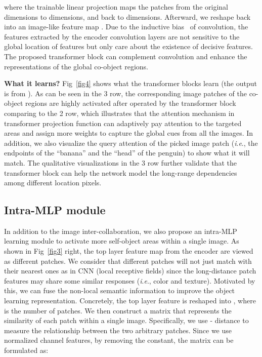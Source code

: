 \documentclass[journal]{IEEEtran}
\newcommand{\ie}{\textit{i}.\textit{e}., }
\begin{document}
where the trainable linear projection maps the patches from the original  dimensions to  dimensions, and back to  dimensions.
Afterward, we reshape  back into an image-like feature map .
Due to the inductive bias~\cite{goyal2020inductive} of convolution, the features extracted by the encoder convolution layers are not sensitive to the global location of features but only care about the existence of decisive features. The proposed transformer block can complement convolution and enhance the representations of the global co-object regions.

\vspace{1ex}

\noindent \textbf{What it learns?}
Fig~\ref{fig4} shows what the transformer blocks learn (the output is from ). As can be seen in the 3 row, the corresponding image patches of the co-object regions are highly activated after operated by the transformer block comparing to the 2 row, which illustrates that the attention mechanism in transformer projection function can adaptively pay attention to the targeted areas and assign more weights to capture the global cues from all the images.
In addition, we also visualize the query attention of the picked image  patch (\ie the endpoints of the “banana” and the “head” of the penguin) to show what it will match.  
The qualitative visualizations in the 3 row further validate that the transformer block can help the network model the long-range dependencies among different location pixels.


\subsection{Intra-MLP module}
In addition to the image inter-collaboration, we also propose an intra-MLP learning module to activate more self-object areas within a single image. 
As shown in Fig~\ref{fig3} right, the top layer feature map from the encoder are viewed as different patches. We consider that different patches will not just match with their nearest ones as in CNN (local receptive fields) since the long-distance patch features may share some similar responses (\ie color and texture).
Motivated by this, we can fuse the non-local semantic information to improve the object learning representation. Concretely, the top layer feature  is reshaped into , where  is the number of patches. We then construct a matrix  that represents the similarity of each patch within a single image. Specifically, we use - distance to measure the relationship between the two arbitrary patches. Since we use normalized channel features, by removing the constant, the matrix  can be formulated as:
\end{document}
